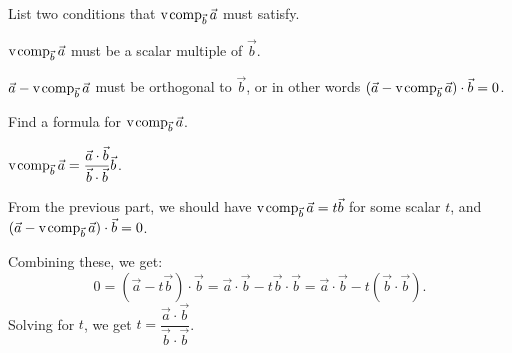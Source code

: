	\begin{parts}
		\item List two conditions that $\operatorname{\operatorname{v\hspace{1pt}comp}}_{\vec b}\vec a$ must satisfy.
			\begin{solution}
				$\operatorname{\operatorname{v\hspace{1pt}comp}}_{\vec b} \vec a$ must be a scalar multiple of $\vec b$.

				$\vec a - \operatorname{\operatorname{v\hspace{1pt}comp}}_{\vec b} \vec a$ must be orthogonal to $\vec b$,
				or in other words $(\vec a-\operatorname{\operatorname{v\hspace{1pt}comp}}_{\vec b}\vec a)\cdot \vec b=0$.
			\end{solution}
		\item Find a formula for $\operatorname{\operatorname{v\hspace{1pt}comp}}_{\vec b}\vec a$.
			\begin{solution}
				$\operatorname{\operatorname{v\hspace{1pt}comp}}_{\vec b}\vec a = \dfrac{\vec a\cdot\vec b}{\vec b\cdot\vec b} \vec b$.

				From the previous part, we should have $\operatorname{\operatorname{v\hspace{1pt}comp}}_{\vec b}\vec a=t\vec b$
				for some scalar $t$, and $(\vec a-\operatorname{\operatorname{v\hspace{1pt}comp}}_{\vec b}\vec a)\cdot \vec b=0$.

				Combining these, we get:
				\[
					0=(\vec a-t \vec b)\cdot \vec b
					=\vec a\cdot\vec b - t\vec b\cdot\vec b
					=\vec a\cdot\vec b - t(\vec b\cdot\vec b).
				\]
				Solving for $t$, we get $t = \dfrac{\vec a\cdot\vec b}{\vec b\cdot\vec b}$.
			\end{solution}
	\end{parts}


